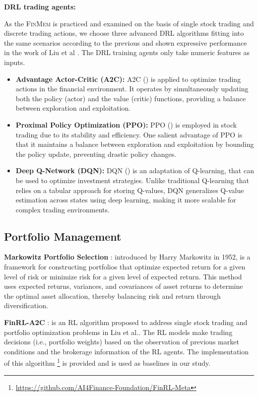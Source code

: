 \textbf{DRL trading agents:} 

As the \textsc{FinMem} is practiced and examined on the basis of single stock trading and discrete trading actions, we choose three advanced DRL algorithms fitting into the same scenarios according to the previous and shown expressive performance in the work of Liu et al \cite{liu2021finrl, liu2022finrl}. The DRL training agents only take numeric features as inputs.

\begin{itemize}
\item \textbf{Advantage Actor-Critic (\textsc{A2C}):} \textsc{A2C} (\cite{mnih2016asynchronous}) is applied to optimize trading actions in the financial environment. It operates by simultaneously updating both the policy (actor) and the value (critic) functions, providing a balance between exploration and exploitation. 
\item \textbf{Proximal Policy Optimization (\textsc{PPO}):} \textsc{PPO} (\cite{schulman2017proximal}) is employed in stock trading due to its stability and efficiency. One salient advantage of PPO is that it maintains a balance between exploration and exploitation by bounding the policy update, preventing drastic policy changes. 
\item \textbf{Deep Q-Network (\textsc{DQN}):} \textsc{DQN} (\cite{mnih2013playing}) is an adaptation of Q-learning, that can be used to optimize investment strategies. Unlike traditional Q-learning that relies on a tabular approach for storing Q-values, DQN generalizes Q-value estimation across states using deep learning, making it more scalable for complex trading environments. 
\end{itemize}


\subsection{Portfolio Management}
\label{explain_portfolio_selection}
\textbf{Markowitz Portfolio Selection} \cite{markowitz1952portfolio}: introduced by Harry Markowitz in 1952, is a framework for constructing portfolios that optimize expected return for a given level of risk or minimize risk for a given level of expected return. This method uses expected returns, variances, and covariances of asset returns to determine the optimal asset allocation, thereby balancing risk and return through diversification.

\textbf{FinRL-A2C} \cite{liu2020finrl}: is an RL algorithm proposed to address single stock trading and portfolio optimization problems in Liu et al.. The RL models make trading decisions (i.e., portfolio weights) based on the observation of previous market conditions and the brokerage information of the RL agents. The implementation of this algorithm \footnote{\url{https://github.com/AI4Finance-Foundation/FinRL-Meta}} is provided and is used as baselines in our study. 

